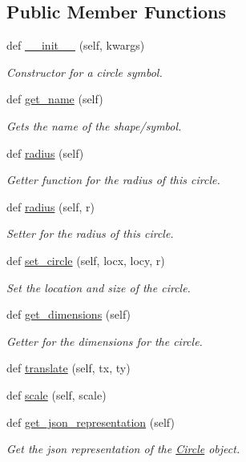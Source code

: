 \subsection*{Public Member Functions}
\begin{DoxyCompactItemize}
\item 
def \hyperlink{classbridges_1_1circle_1_1_circle_a04dfb68bb632534cf715e2ce927cc76a}{\+\_\+\+\_\+init\+\_\+\+\_\+} (self, kwargs)
\begin{DoxyCompactList}\small\item\em Constructor for a circle symbol. \end{DoxyCompactList}\item 
def \hyperlink{classbridges_1_1circle_1_1_circle_acacc4d8cc5f2db86cfcba61f31652003}{get\+\_\+name} (self)
\begin{DoxyCompactList}\small\item\em Gets the name of the shape/symbol. \end{DoxyCompactList}\item 
def \hyperlink{classbridges_1_1circle_1_1_circle_abc82c7f3e8ac6112167b396839863319}{radius} (self)
\begin{DoxyCompactList}\small\item\em Getter function for the radius of this circle. \end{DoxyCompactList}\item 
def \hyperlink{classbridges_1_1circle_1_1_circle_ae7c2dc54c90d954626f99d7561009587}{radius} (self, r)
\begin{DoxyCompactList}\small\item\em Setter for the radius of this circle. \end{DoxyCompactList}\item 
def \hyperlink{classbridges_1_1circle_1_1_circle_a42b7ccd17017ca328371ce27e1bdbffe}{set\+\_\+circle} (self, locx, locy, r)
\begin{DoxyCompactList}\small\item\em Set the location and size of the circle. \end{DoxyCompactList}\item 
def \hyperlink{classbridges_1_1circle_1_1_circle_a8b6af5d39ec48245f0244a7499082822}{get\+\_\+dimensions} (self)
\begin{DoxyCompactList}\small\item\em Getter for the dimensions for the circle. \end{DoxyCompactList}\item 
def \hyperlink{classbridges_1_1circle_1_1_circle_ad56c923b12df5ce2db3588175ce3b646}{translate} (self, tx, ty)
\item 
def \hyperlink{classbridges_1_1circle_1_1_circle_ac594fe605b117b591690588c5469ceac}{scale} (self, scale)
\item 
def \hyperlink{classbridges_1_1circle_1_1_circle_a7a1be40bcd6028dab0a5bcab6e69c355}{get\+\_\+json\+\_\+representation} (self)
\begin{DoxyCompactList}\small\item\em Get the json representation of the \hyperlink{classbridges_1_1circle_1_1_circle}{Circle} object. \end{DoxyCompactList}\end{DoxyCompactItemize}
